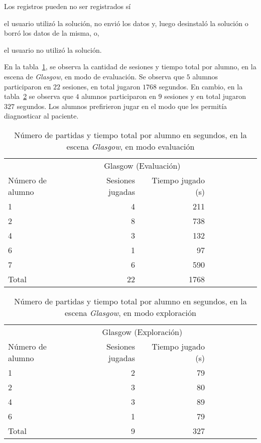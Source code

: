Los registros pueden no ser registrados sí
\begin{enumerate*}[label=\itshape\alph*\upshape)]
    \item el usuario utilizó la solución, no envió los datos y, luego
        desinstaló la solución o borró los datos de la misma, o,
    \item el usuario no utilizó la solución.
\end{enumerate*}

En la tabla~\ref{tab:log_glasgow_random_partida}, se observa la cantidad de
sesiones y tiempo total por alumno, en la escena de \textit{Glasgow}, en modo de
evaluación. Se observa que $5$ alumnos participaron en $22$ sesiones, en total
jugaron $1768$ segundos. En cambio, en la tabla~\ref{tab:log_glasgow_custom_partida} se 
observa que $4$ alumnos participaron en $9$ sesiones y en total jugaron $327$ segundos. 
Los alumnos prefirieron jugar en el modo que les permitía diagnosticar al paciente.

\begin{table}[H]
\centering
\begin{tabular}{lrrrrrrrr}
\toprule
& \multicolumn{2}{c}{Glasgow (Evaluación)} \\
                   \cmidrule(lr){2-3} 
Número de alumno   & Sesiones jugadas                            & Tiempo jugado (s) \\
\midrule
1     & 4  & 211 \\
2     & 8  & 738 \\
4     & 3  & 132 \\
6     & 1  & 97  \\
7     & 6  & 590 \\
\midrule
Total & 22 & 1768 \\
\bottomrule
\end{tabular}
\caption{Número de partidas y tiempo total por alumno en segundos, en la escena
    \textit{Glasgow}, en modo evaluación}
\label{tab:log_glasgow_random_partida}
\end{table}


\begin{table}[H]
\centering
\begin{tabular}{lrrrrrrrr}
\toprule
& \multicolumn{2}{c}{Glasgow (Exploración)} \\
                   \cmidrule(lr){2-3} 
Número de alumno   & Sesiones jugadas                            & Tiempo jugado (s) \\
\midrule
1        & 2 & 79 \\
2        & 3 & 80 \\
4        & 3 & 89 \\
6        & 1 & 79 \\
\midrule
Total   & 9 & 327 \\
\bottomrule
\end{tabular}
\caption{Número de partidas y tiempo total por alumno en segundos, en la escena
    \textit{Glasgow}, en modo exploración}
\label{tab:log_glasgow_custom_partida}
\end{table}


